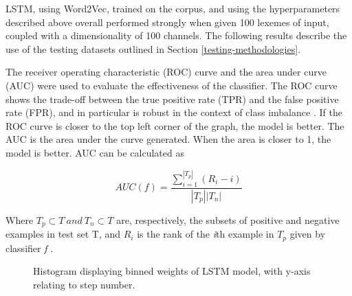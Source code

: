 LSTM, using Word2Vec, trained on the corpus, and using the hyperparameters described above overall performed strongly when given 100 lexemes of input, coupled with a dimensionality of 100 channels. The following results describe the use of the testing datasets outlined in Section \ref{testing-methodologies}. 

The receiver operating characteristic (ROC) curve and the area under curve (AUC) were used to evaluate the effectiveness of the classifier. The ROC curve shows the trade-off between the true positive rate (TPR) and the false positive rate (FPR), and in particular is robust in the context of class imbalance \cite{japkowicz2011evaluating}. If the ROC curve is closer to the top left corner of the graph, the model is better. The AUC is the area under the curve generated. When the area is closer to 1, the model is better. AUC can be calculated as




\begin{equation}
AUC(f) = \frac{\sum_{i = 1}^{|T_{p}|}(R_i - i)}{|T_p||T_n|}
\end{equation}

Where $T_p \subset T \: and \: T_n \subset T$ are, respectively, the subsets of positive and negative examples in test set T, and $R_i$ is the rank of the \textit{i}th example in $T_p$ given by classifier \textit{f} \cite{japkowicz2011evaluating}.

    \begin{figure}[thpb]
      \centering
      \caption{Histogram displaying binned weights of LSTM model, with y-axis relating to step number.}
      \label{fig:histogram-lstm}
   \end{figure}


